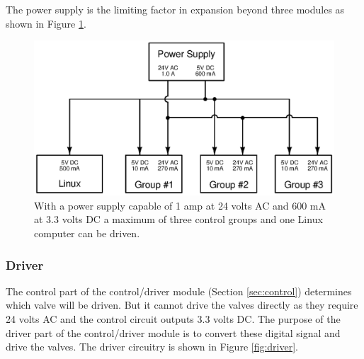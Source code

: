 \documentclass{article}
\begin{document}
The power supply is the limiting factor in expansion beyond three
modules as shown in Figure \ref{fig:expansion_current}.

\begin{figure}[hbp]
\centering
\includegraphics[angle=0,scale=0.80]{xcircuit/expansion_current}
\caption{With a power supply capable of 1 amp at 24 volts AC and
600 mA at 3.3 volts DC a maximum of three control groups and one
Linux computer can be driven.}\label{fig:expansion_current}
\end{figure}


\pagebreak

\FloatBarrier
\subsubsection{Driver}
\label{sec:driver}

The control part of the control/driver module (Section \ref{sec:control})
determines which valve will be driven.  But it cannot drive the valves
directly as they require 24 volts AC and the control circuit outputs
3.3 volts DC.
The purpose of the driver part of the control/driver module is to convert
these digital signal and drive the valves.
The driver circuitry is shown in Figure \ref{fig:driver}.
\end{document}
